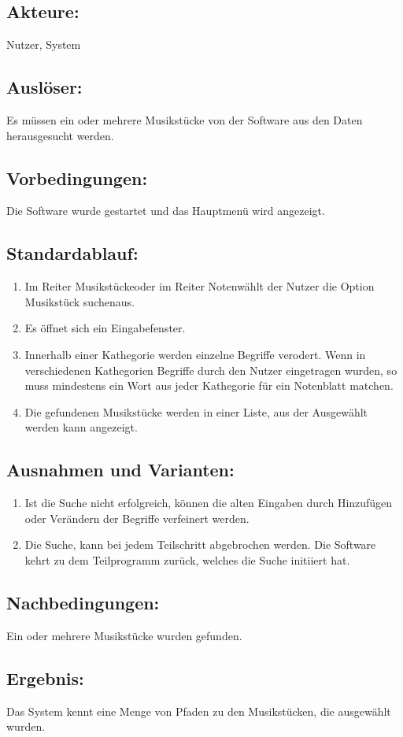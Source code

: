 \documentclass[a4paper,10pt]{scrartcl}
\begin{document}
\subsection{Akteure:}
Nutzer, System
\subsection{Auslöser:}
Es müssen ein oder mehrere Musikstücke von der Software aus den Daten herausgesucht werden.
\subsection{Vorbedingungen:}
Die Software wurde gestartet und das Hauptmenü wird angezeigt.
\subsection{Standardablauf:}
\begin{enumerate}
	\item Im Reiter \glqq Musikstücke\grqq oder im Reiter \glqq Noten\grqq wählt der Nutzer die Option \glqq Musikstück suchen\grqq aus.
 	\item Es öffnet sich ein Eingabefenster.
 	\item Innerhalb einer Kathegorie werden einzelne Begriffe verodert. Wenn in verschiedenen Kathegorien Begriffe durch den Nutzer eingetragen wurden, so muss mindestens ein Wort aus jeder Kathegorie für ein Notenblatt matchen.
 	\item Die gefundenen Musikstücke werden in einer Liste, aus der Ausgewählt werden kann angezeigt.
\end{enumerate}
\subsection{Ausnahmen und Varianten:}
\begin{enumerate}
	\item Ist die Suche nicht erfolgreich, können die alten Eingaben durch Hinzufügen oder Verändern der Begriffe verfeinert werden.
	\item Die Suche, kann bei jedem Teilschritt abgebrochen werden. Die Software kehrt zu dem Teilprogramm zurück, welches die Suche initiiert hat.
\end{enumerate}
\subsection{Nachbedingungen:}
Ein oder mehrere Musikstücke wurden gefunden.
\subsection{Ergebnis:}
Das System kennt eine Menge von Pfaden zu den Musikstücken, die ausgewählt wurden.
\end{document}
